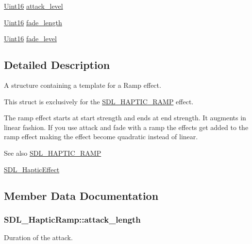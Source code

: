 \begin{DoxyCompactItemize}
\item 
\hyperlink{_s_d_l__stdinc_8h_a31fcc0a076c9068668173ee26d33e42b}{Uint16} \hyperlink{struct_s_d_l___haptic_ramp_a755933bbda14ae9b53c574b9fe6291a0}{attack\+\_\+level}
\item 
\hyperlink{_s_d_l__stdinc_8h_a31fcc0a076c9068668173ee26d33e42b}{Uint16} \hyperlink{struct_s_d_l___haptic_ramp_ad58a8f7cfdf659b45f0503fc56db7436}{fade\+\_\+length}
\item 
\hyperlink{_s_d_l__stdinc_8h_a31fcc0a076c9068668173ee26d33e42b}{Uint16} \hyperlink{struct_s_d_l___haptic_ramp_a66b586f2e6a23a085a7b2854f61752c5}{fade\+\_\+level}
\end{DoxyCompactItemize}


\subsection{Detailed Description}
A structure containing a template for a Ramp effect. 

This struct is exclusively for the \hyperlink{_s_d_l__haptic_8h_af10eb937a64a8f602e9c46682ac0d868}{S\+D\+L\+\_\+\+H\+A\+P\+T\+I\+C\+\_\+\+R\+A\+MP} effect.

The ramp effect starts at start strength and ends at end strength. It augments in linear fashion. If you use attack and fade with a ramp the effects get added to the ramp effect making the effect become quadratic instead of linear.

\begin{DoxySeeAlso}{See also}
\hyperlink{_s_d_l__haptic_8h_af10eb937a64a8f602e9c46682ac0d868}{S\+D\+L\+\_\+\+H\+A\+P\+T\+I\+C\+\_\+\+R\+A\+MP} 

\hyperlink{union_s_d_l___haptic_effect}{S\+D\+L\+\_\+\+Haptic\+Effect} 
\end{DoxySeeAlso}


\subsection{Member Data Documentation}
\subsubsection[{\texorpdfstring{attack\+\_\+length}{attack_length}}]{ S\+D\+L\+\_\+\+Haptic\+Ramp\+::attack\+\_\+length}\hypertarget{struct_s_d_l___haptic_ramp_adbcd7ffb05016d442c73e81cc0fcbbd2}{}\label{struct_s_d_l___haptic_ramp_adbcd7ffb05016d442c73e81cc0fcbbd2}
Duration of the attack. 
